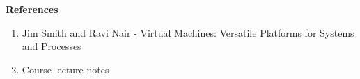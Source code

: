 \documentclass[11pt,a4paper,oneside]{article}
\begin{document}
\begin{enumerate}
 		
	        			
	\end{enumerate}
    
    \textbf{References}
    \begin{enumerate}
    	\item Jim Smith and Ravi Nair - Virtual Machines: Versatile Platforms for Systems and Processes  	
    	\item Course lecture notes
    \end{enumerate}
 

    
\end{document}
